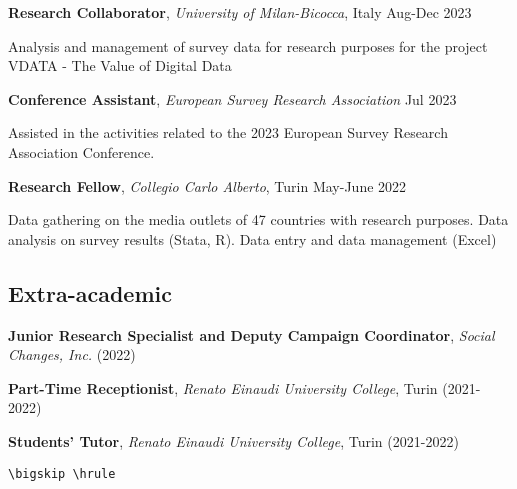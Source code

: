 \documentclass[8pt,]{article}
\providecommand{\tightlist}{%
  \setlength{\itemsep}{0pt}\setlength{\parskip}{0pt}}
\renewenvironment{itemize}{
  \begin{list}{}{
    \setlength{\leftmargin}{1.5em}
  }
}{
  \end{list}
}
\begin{document}
\begin{itemize}
\tightlist
\item
  \textbf{Research Collaborator}, \emph{University of Milan-Bicocca},
  Italy \hfill Aug-Dec 2023

  \begin{itemize}
  \tightlist
  \item
    Analysis and management of survey data for research purposes for the
    project VDATA - The Value of Digital Data
  \end{itemize}
\item
  \textbf{Conference Assistant}, \emph{European Survey Research
  Association} \hfill Jul 2023

  \begin{itemize}
  \tightlist
  \item
    Assisted in the activities related to the 2023 European Survey
    Research Association Conference.
  \end{itemize}
\item
  \textbf{Research Fellow}, \emph{Collegio Carlo Alberto}, Turin
  \hfill May-June 2022

  \begin{itemize}
  \tightlist
  \item
    Data gathering on the media outlets of 47 countries with research
    purposes. Data analysis on survey results (Stata, R). Data entry and
    data management (Excel)
  \end{itemize}
\end{itemize}

\hypertarget{extra-academic}{%
\subsection{Extra-academic}\label{extra-academic}}

\begin{itemize}
\item
  \textbf{Junior Research Specialist and Deputy Campaign Coordinator},
  \emph{Social Changes, Inc.} (2022)
\item
  \textbf{Part-Time Receptionist}, \emph{Renato Einaudi University
  College}, Turin (2021-2022)
\item
  \textbf{Students' Tutor}, \emph{Renato Einaudi University College},
  Turin (2021-2022)

\begin{verbatim}
\bigskip \hrule
\end{verbatim}
\end{itemize}
\end{document}
